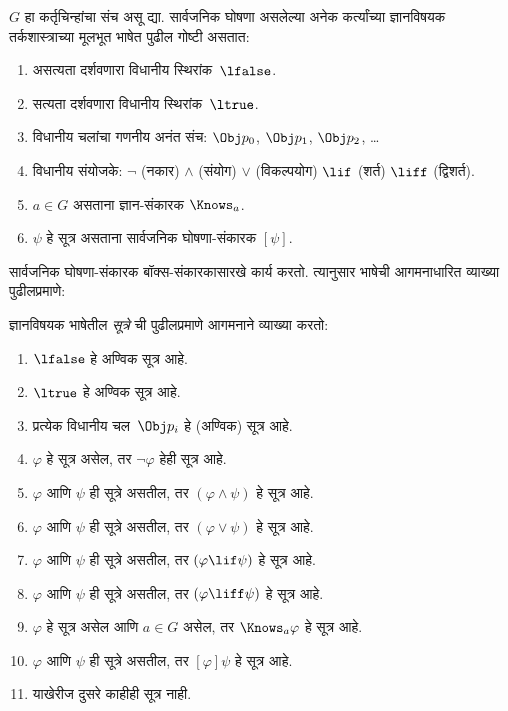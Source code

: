 \begin{defn}
$G$ हा कर्तृचिन्हांचा संच असू द्या. सार्वजनिक घोषणा
असलेल्या अनेक कर्त्यांच्या ज्ञानविषयक तर्कशास्त्राच्या
मूलभूत भाषेत पुढील गोष्टी असतात:
\begin{enumerate}
  \item असत्यता दर्शवणारा विधानीय स्थिरांक~$\lfalse$.
  \item सत्यता दर्शवणारा विधानीय स्थिरांक~$\ltrue$.
  \item विधानीय चलांचा गणनीय अनंत संच: $\Obj
    p_0$, $\Obj p_1$, $\Obj p_2$, \dots
  \item विधानीय संयोजके: \startycommalist
  \ycomma $\lnot$ (नकार)
  \ycomma $\land$ (संयोग)
  \ycomma $\lor$ (विकल्पयोग)
  \ycomma $\lif$ (शर्त)
  \ycomma $\liff$ (द्विशर्त).
  \item $a \in G$ असताना ज्ञान-संकारक $\Knows_a$.
  \item $\psi$ हे सूत्र असताना सार्वजनिक घोषणा-संकारक $[\psi]$.
\end{enumerate}
\end{defn}

सार्वजनिक घोषणा-संकारक बॉक्स-संकारकासारखे कार्य
करतो. त्यानुसार भाषेची आगमनाधारित व्याख्या पुढीलप्रमाणे:

\begin{defn}
  ज्ञानविषयक भाषेतील \emph{सूत्रे} ची पुढीलप्रमाणे
  आगमनाने व्याख्या करतो:
  \begin{enumerate}
  \item $\lfalse$ हे अण्विक सूत्र आहे.

  \item $\ltrue$ हे अण्विक सूत्र आहे.

  \item प्रत्येक विधानीय चल~$\Obj p_i$ हे (अण्विक)
  सूत्र आहे.

  \item $\varphi$ हे सूत्र असेल, तर $\lnot \varphi$
  हेही सूत्र आहे.

  \item $\varphi$ आणि $\psi$ ही सूत्रे असतील, तर $(\varphi \land
  \psi)$ हे सूत्र आहे.

  \item $\varphi$ आणि $\psi$ ही सूत्रे असतील, तर $(\varphi \lor \psi)$
  हे सूत्र आहे.

  \item $\varphi$ आणि $\psi$ ही सूत्रे असतील, तर $(\varphi \lif \psi)$
  हे सूत्र आहे.

  \item $\varphi$ आणि $\psi$ ही सूत्रे असतील, तर $(\varphi \liff \psi)$
  हे सूत्र आहे.

  \item $\varphi$ हे सूत्र असेल आणि $a \in G$ असेल,
  तर $\Knows_a \varphi$ हे सूत्र आहे.

  \item $\varphi$ आणि $\psi$ ही सूत्रे असतील,
  तर $[\varphi] \psi$ हे सूत्र आहे.

  \item याखेरीज दुसरे काहीही सूत्र नाही.
\end{enumerate}
\end{defn}

